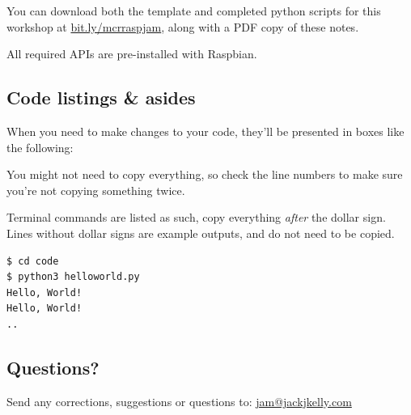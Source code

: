 \documentclass[a4paper, twocolumn, twoside, 11pt]{article}
\begin{document}
			\newpage
				
			You can download both the template and completed python scripts for this workshop at \url{bit.ly/mcrraspjam}, along with a PDF copy of these notes.
			
			All required APIs are pre-installed with Raspbian.
			
	
		\subsection*{Code listings \& asides}
	
			When you need to make changes to your code, they'll be presented in boxes like the following:

			
	
			You might not need to copy everything, so check the line numbers to make sure you're not copying something twice.
			
			Terminal commands are listed as such, copy everything \textit{after} the dollar sign. Lines without dollar signs are example outputs, and do not need to be copied.
			
			\begin{lstlisting}
$ cd code
$ python3 helloworld.py 
Hello, World!
Hello, World!
..
			\end{lstlisting}
		
		\subsection*{Questions?}
		
			Send any corrections, suggestions or questions to:
			\url{jam@jackjkelly.com}\label{email}
	
	
 	\newpage
	
	
	
\end{document}
